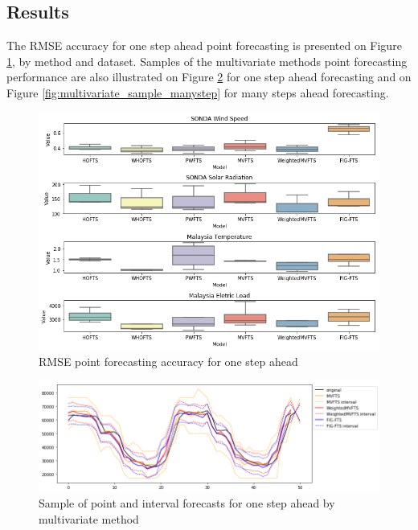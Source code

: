 \subsection{Results}
\label{sec:multivariate_results}

The RMSE accuracy for one step ahead point forecasting is presented on Figure \ref{fig:multivariate_point_results}, by method and dataset. Samples of the multivariate methods point forecasting performance are also illustrated on Figure \ref{fig:multivariate_sample_onestep} for one step ahead forecasting and on Figure \ref{fig:multivariate_sample_manystep} for many steps ahead forecasting.

\begin{figure}[htb]
    \centering
    \includegraphics[width=\textwidth]{figures/multivariate_point_results.png}
    \caption{RMSE point forecasting accuracy for one step ahead}
    \label{fig:multivariate_point_results}
\end{figure}

\begin{figure}[htb]
    \centering
    \includegraphics[width=\textwidth]{figures/multivariate_sample_onestep.png}
    \caption{Sample of point and interval forecasts for one step ahead by multivariate method}
    \label{fig:multivariate_sample_onestep}
\end{figure}

